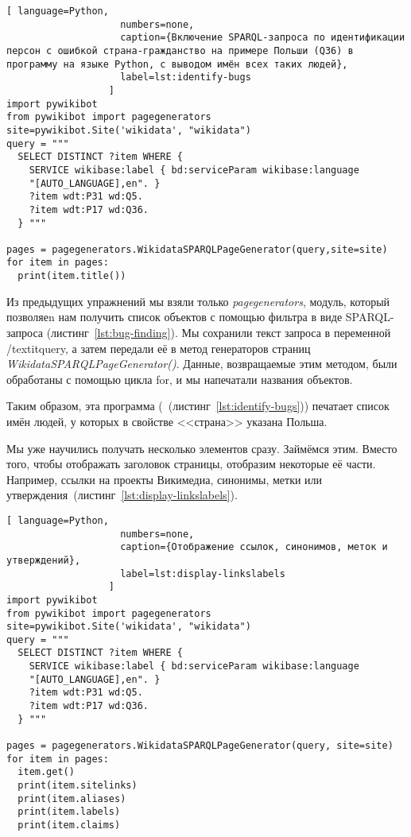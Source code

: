 \begin{lstlisting}[ language=Python,
                    numbers=none,
                    caption={Включение SPARQL-запроса по идентификации персон с ошибкой страна-гражданство на примере Польши (Q36) в программу на языке Python, с выводом имён всех таких людей},
                    label=lst:identify-bugs
                  ]
import pywikibot
from pywikibot import pagegenerators
site=pywikibot.Site('wikidata', "wikidata")
query = """
  SELECT DISTINCT ?item WHERE {
    SERVICE wikibase:label { bd:serviceParam wikibase:language 
    "[AUTO_LANGUAGE],en". }
    ?item wdt:P31 wd:Q5.
    ?item wdt:P17 wd:Q36.
  } """

pages = pagegenerators.WikidataSPARQLPageGenerator(query,site=site)
for item in pages:
  print(item.title())
\end{lstlisting}    

Из предыдущих упражнений мы взяли только \textit{pagegenerators}, модуль, который позволяеn нам получить список объектов с помощью фильтра в виде SPARQL-запроса (листинг~\ref{lst:bug-finding}). Мы сохранили текст запроса в переменной /textit{query}, а затем передали её в метод генераторов страниц \textit{WikidataSPARQLPageGenerator()}. Данные, возвращаемые этим методом, были обработаны с помощью цикла for, и мы напечатали названия объектов.

Таким образом, эта программа (~(листинг~\ref{lst:identify-bugs})) печатает список имён людей, у которых в свойстве <<страна>> указана Польша.

Мы уже научились получать несколько элементов сразу. Займёмся этим. Вместо того, чтобы отображать заголовок страницы, отобразим некоторые её части. Например, ссылки на проекты Викимедиа, синонимы, метки или утверждения~(листинг~\ref{lst:display-linkslabels}).

\begin{lstlisting}[ language=Python,
                    numbers=none,
                    caption={Отображение ссылок, синонимов, меток и утверждений},
                    label=lst:display-linkslabels
                  ]
import pywikibot
from pywikibot import pagegenerators
site=pywikibot.Site('wikidata', "wikidata")
query = """
  SELECT DISTINCT ?item WHERE {
    SERVICE wikibase:label { bd:serviceParam wikibase:language 
    "[AUTO_LANGUAGE],en". }
    ?item wdt:P31 wd:Q5.
    ?item wdt:P17 wd:Q36.
  } """

pages = pagegenerators.WikidataSPARQLPageGenerator(query, site=site)
for item in pages:
  item.get()
  print(item.sitelinks)
  print(item.aliases)
  print(item.labels)
  print(item.claims)
\end{lstlisting} 

